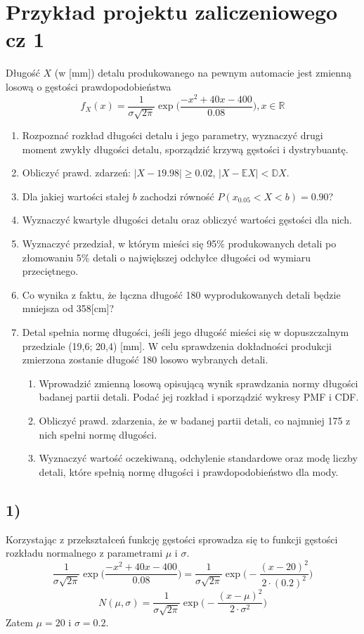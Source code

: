 \documentclass{article}
\begin{document}
{\section{Przykład projektu zaliczeniowego cz 1}
Długość $X$ (w [mm]) detalu produkowanego na pewnym automacie jest zmienną losową o gęstości prawdopodobieństwa
$$f_{X}(x) = \frac{1}{\sigma\sqrt{2\pi}}\exp\Big(\frac{-x^2+40x-400}{0.08}\Big), x\in\mathbb{R}$$

\begin{enumerate}
\item Rozpoznać rozkład długości detalu i jego parametry, wyznaczyć drugi moment zwykły długości detalu, sporządzić krzywą gęstości i dystrybuantę.
\item Obliczyć prawd. zdarzeń: $|X-19.98|\geq 0.02$, $|X-\mathbb{E}X|<\mathbb{D}X$.
\item Dla jakiej wartości stałej $b$ zachodzi równość $P(x_{0.05}<X<b)=0.90$?
\item Wyznaczyć kwartyle długości detalu oraz obliczyć wartości gęstości dla nich.
\item Wyznaczyć przedział, w którym mieści się 95\% produkowanych detali po złomowaniu 5\% detali o największej odchyłce długości od wymiaru przeciętnego.
\item Co wynika z faktu, że łączna długość 180 wyprodukowanych detali będzie mniejsza od 358[cm]?
\item Detal spełnia normę długości, jeśli jego długość mieści się w dopuszczalnym przedziale (19,6; 20,4) [mm]. W celu sprawdzenia dokładności produkcji zmierzona zostanie długość 180 losowo wybranych detali.
\begin{enumerate}
\item Wprowadzić zmienną losową opisującą wynik sprawdzania normy długości badanej partii detali. Podać jej rozkład i sporządzić wykresy PMF i CDF.
\item Obliczyć prawd. zdarzenia, że w badanej partii detali, co najmniej 175 z nich spełni normę długości.
\item Wyznaczyć wartość oczekiwaną, odchylenie standardowe oraz modę liczby detali, które spełnią normę długości i prawdopodobieństwo dla mody.
\end{enumerate}
\end{enumerate}

\subsection{1)}
Korzystając z przekształceń funkcję gęstości sprowadza się to funkcji gęstości rozkładu normalnego z parametrami $\mu$ i $\sigma$.
$$\frac{1}{\sigma\sqrt{2\pi}}\exp\Big(\frac{-x^2+40x-400}{0.08}\Big) = \frac{1}{\sigma\sqrt{2\pi}}\exp\Big(-\frac{(x-20)^2}{2\cdot(0.2)^2}\Big)$$
$$N(\mu,\sigma) = \frac{1}{\sigma\sqrt{2\pi}}\exp\Big(-\frac{(x-\mu)^2}{2\cdot\sigma^2}\Big)$$
Zatem $\mu = 20$ i $\sigma = 0.2$.

}
\end{document}

